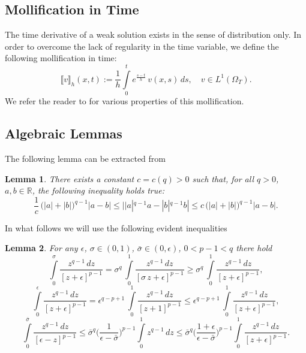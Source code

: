 \documentclass[a4paper,11pt,fullpage]{article}
\numberwithin{equation}{section}
\newtheorem{lemma}{Lemma}[section]
\begin{document}
\subsection{Mollification in Time}
The time derivative of a weak solution exists in the sense of distribution only.   In 
order to overcome the lack of regularity in the time variable, we define the following 
mollification in time:
$$\llbracket v \rrbracket_h(x, t):=\frac{1}{h}\int\limits_0^t e^{\frac{s-t}{h}}\,v(x, s)\,ds,\quad v\in L^1(\Omega_T).$$
We refer the reader to \cite{Kin} for various properties of this mollification.



\subsection{Algebraic Lemmas}
The following lemma can be extracted from \cite[Lemma 2.1]{Bog1}
\begin{lemma}\label{lem2.1}
There exists a constant $c = c(q)>0$ such that, for all $q>0$, 
 $a, b\in \mathbb{R}$, the following inequality holds true:
 \begin{equation*}
 \frac{1}{c}\,\big(|a|+|b|\big)^{q-1}|a-b|\leqslant ||a|^{q-1}a -|b|^{q-1} b|\leqslant c\,\big(|a|+|b|\big)^{q-1}|a-b|.
 \end{equation*}
\end{lemma}
In what follows we will use the following evident inequalities
\begin{lemma}\label{lem2.2}
For any $\epsilon$, $\sigma \in (0, 1)$, $\bar{\sigma}\in (0, \epsilon)$, $0<p-1<q$  there hold
\begin{equation}\label{eq2.2}
\int\limits^\sigma_0\frac{z^{q-1}\,dz}{[z+\epsilon]^{p-1}}=\sigma^q\,\int\limits^1_0\frac{z^{q-1}\,dz}{[\sigma\,z+\epsilon]^{p-1}}
\geqslant \sigma^q\,\int\limits^1_0\frac{z^{q-1}\,dz}{[z+\epsilon]^{p-1}},
\end{equation}
\begin{equation}\label{eq2.3}
\int\limits^\epsilon_0\frac{z^{q-1}\,dz}{[z+\epsilon]^{p-1}}=\epsilon^{q-p+1}\,\int\limits^1_0\frac{z^{q-1}\,dz}{[z+1]^{p-1}}
\leqslant \epsilon^{q-p+1}\,\int\limits^1_0\frac{z^{q-1}\,dz}{[z+\epsilon]^{p-1}},
\end{equation}
\begin{equation}\label{eq2.4}
\int\limits^{\bar{\sigma}}_0\frac{z^{q-1}\,dz}{[\epsilon-z]^{p-1}}\leqslant \bar{\sigma}^q\Big(\frac{1}{\epsilon-\bar{\sigma}}\Big)^{p-1}\int\limits
^1_0 z^{q-1}\,dz\leqslant
\bar{\sigma}^q\Big(\frac{1+\epsilon}{\epsilon-\bar{\sigma}}\Big)^{p-1}\int\limits
^1_0\frac{z^{q-1}\,dz}{[z+\epsilon]^{p-1}}.
\end{equation}
\end{lemma}
\end{document}
